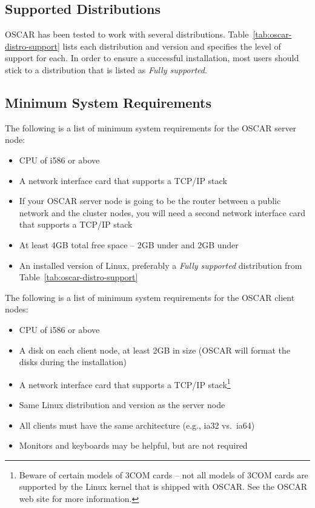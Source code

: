 \subsection{Supported Distributions}

OSCAR has been tested to work with several distributions.
Table~\ref{tab:oscar-distro-support} lists each distribution and
version and specifies the level of support for each. In order to
ensure a successful installation, most users should stick to a
distribution that is listed as \emph{Fully supported}.




\subsection{Minimum System Requirements}
\label{sec:intro-min-sys}

\begchange

The following is a list of minimum system requirements for the OSCAR
server node:

\begin{itemize}
\item CPU of i586 or above
\item A network interface card that supports a TCP/IP stack
\item If your OSCAR server node is going to be the router between a
  public network and the cluster nodes, you will need a second
  network interface card that supports a TCP/IP stack
\item At least 4GB total free space -- 2GB under \file{/} and 2GB
  under 
\item An installed version of Linux, preferably a {\em Fully
    supported} distribution from Table~\ref{tab:oscar-distro-support}
\end{itemize}

The following is a list of minimum system requirements for the OSCAR
client nodes:

\begin{itemize}
\item CPU of i586 or above
\item A disk on each client node, at least 2GB in size (OSCAR will
  format the disks during the installation)
\item A network interface card that supports a TCP/IP
  stack\footnote{Beware of certain models of 3COM cards -- not all
    models of 3COM cards are supported by the Linux kernel that is
    shipped with OSCAR.  See the OSCAR web site for more information.}
\item Same Linux distribution and version as the server node
\item All clients must have the same architecture (e.g., ia32 vs.\ 
  ia64)
\item Monitors and keyboards may be helpful, but are not required
\end{itemize}

